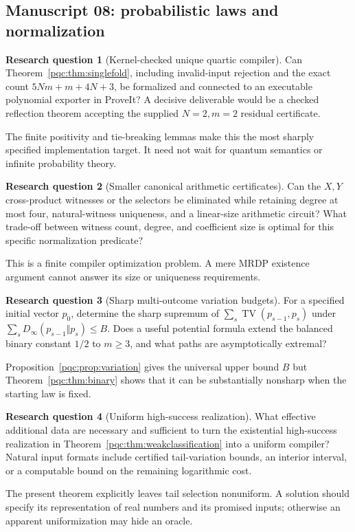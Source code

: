 \documentclass[11pt,letterpaper]{article}
\numberwithin{equation}{section}
\theoremstyle{definition}
\newtheorem{question}{Research question}
\theoremstyle{remark}
\newcommand{\TV}{\operatorname{TV}}
\newcommand{\Dinf}{D_{\infty}}
\begin{document}
\subsection{Manuscript 08: probabilistic laws and normalization}
\label{pqc:conv:q08}\label{pqc:sec:questions}
\begin{question}[Kernel-checked unique quartic compiler]\label{pqc:q:kernel}
Can Theorem~\ref{pqc:thm:singlefold}, including invalid-input rejection and the
exact count $5Nm+m+4N+3$, be formalized and connected to an executable
polynomial exporter in ProveIt? A decisive deliverable would be a checked
reflection theorem accepting the supplied $N=2,m=2$ residual certificate.
\end{question}
The finite positivity and tie-breaking lemmas make this the most sharply
specified implementation target. It need not wait for quantum semantics or
infinite probability theory.

\begin{question}[Smaller canonical arithmetic certificates]\label{pqc:q:smaller}
Can the $X,Y$ cross-product witnesses or the selectors be eliminated while
retaining degree at most four, natural-witness uniqueness, and a linear-size
arithmetic circuit? What trade-off between witness count, degree, and
coefficient size is optimal for this specific normalization predicate?
\end{question}
This is a finite compiler optimization problem. A mere MRDP existence
argument cannot answer its size or uniqueness requirements.

\begin{question}[Sharp multi-outcome variation budgets]
For a specified initial vector $p_0$, determine the sharp supremum of
$\sum_s\TV(p_{s-1},p_s)$ under
$\sum_s\Dinf(p_{s-1}\Vert p_s)\le B$. Does a useful potential formula
extend the balanced binary constant $1/2$ to $m\ge3$, and what paths are
asymptotically extremal?
\end{question}
Proposition~\ref{pqc:prop:variation} gives the universal upper bound $B$ but
Theorem~\ref{pqc:thm:binary} shows that it can be substantially nonsharp when
the starting law is fixed.

\begin{question}[Uniform high-success realization]
What effective additional data are necessary and sufficient to turn the
existential high-success realization in
Theorem~\ref{pqc:thm:weakclassification} into a uniform compiler? Natural input
formats include certified tail-variation bounds, an interior interval, or a
computable bound on the remaining logarithmic cost.
\end{question}
The present theorem explicitly leaves tail selection nonuniform. A solution
should specify its representation of real numbers and its promised inputs;
otherwise an apparent uniformization may hide an oracle.
\end{document}
